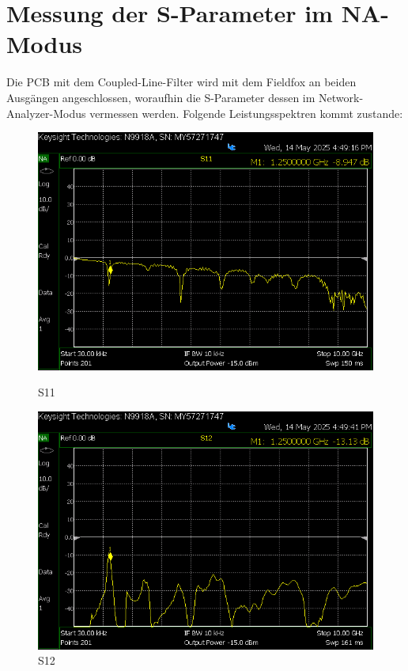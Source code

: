 
    
\section{Messung der S-Parameter im NA-Modus}
Die PCB mit dem Coupled-Line-Filter wird mit dem Fieldfox an beiden Ausgängen angeschlossen, 
    woraufhin die S-Parameter dessen im Network-Analyzer-Modus vermessen werden. Folgende Leistungsspektren kommt zustande:
    \begin{figure}[H]
        
        \begin{minipage}{0.45\textwidth}
            \centering
            \includegraphics[width=\linewidth]{Pictures/S11neuCooleGrupp.png}
            \caption*{S11}
        \end{minipage}
        \hfill
        \begin{minipage}{0.45\textwidth}
            \centering
            \includegraphics[width=\linewidth]{Pictures/S12neuCooleGrupp.png}
            \caption*{S12}
        \end{minipage}


\end{figure}
